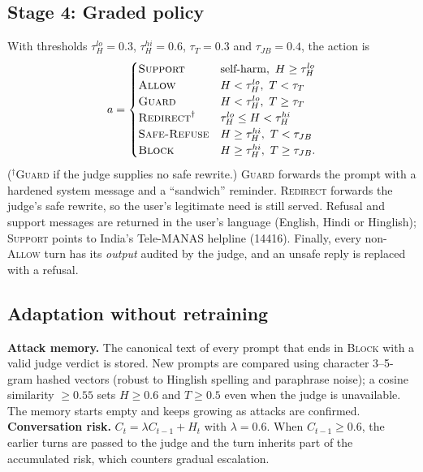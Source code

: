 \documentclass[conference]{IEEEtran}
\begin{document}
\subsection{Stage 4: Graded policy}
With thresholds $\tau_H^{lo}=0.3$, $\tau_H^{hi}=0.6$, $\tau_T=0.3$ and $\tau_{JB}=0.4$, the action is
\begin{equation*}
a=\begin{cases}
\textsc{Support} & \text{self-harm},\ H\ge\tau_H^{lo}\\
\textsc{Allow} & H<\tau_H^{lo},\ T<\tau_T\\
\textsc{Guard} & H<\tau_H^{lo},\ T\ge\tau_T\\
\textsc{Redirect}^{\dagger} & \tau_H^{lo}\le H<\tau_H^{hi}\\
\textsc{Safe-Refuse} & H\ge\tau_H^{hi},\ T<\tau_{JB}\\
\textsc{Block} & H\ge\tau_H^{hi},\ T\ge\tau_{JB}.
\end{cases}
\end{equation*}
($^\dagger$\textsc{Guard} if the judge supplies no safe rewrite.)
\textsc{Guard} forwards the prompt with a hardened system message and a ``sandwich'' reminder. \textsc{Redirect} forwards the judge's safe rewrite, so the user's legitimate need is still served. Refusal and support messages are returned in the user's language (English, Hindi or Hinglish); \textsc{Support} points to India's Tele-MANAS helpline (14416). Finally, every non-\textsc{Allow} turn has its \emph{output} audited by the judge, and an unsafe reply is replaced with a refusal.

\subsection{Adaptation without retraining}
\textbf{Attack memory.} The canonical text of every prompt that ends in \textsc{Block} with a valid judge verdict is stored. New prompts are compared using character 3--5-gram hashed vectors (robust to Hinglish spelling and paraphrase noise); a cosine similarity $\ge0.55$ sets $H\ge0.6$ and $T\ge0.5$ even when the judge is unavailable. The memory starts empty and keeps growing as attacks are confirmed.
\textbf{Conversation risk.} $C_t=\lambda C_{t-1}+H_t$ with $\lambda=0.6$. When $C_{t-1}\ge0.6$, the earlier turns are passed to the judge and the turn inherits part of the accumulated risk, which counters gradual escalation.
\end{document}
